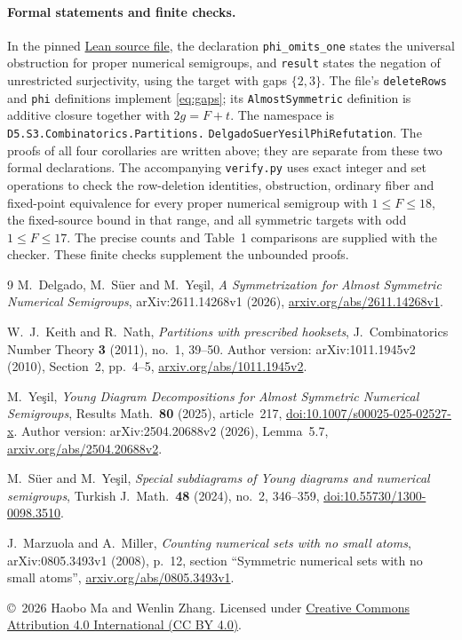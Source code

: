 \documentclass[11pt]{article}
\begin{document}
\paragraph{Formal statements and finite checks.}
In the pinned \href{https://github.com/the-omega-institute/trureturing/blob/f960cb09514c99f42fd07398f5240a77378ea4db/D5/S3/Combinatorics/Partitions/DelgadoSuerYesilPhiRefutation.lean}{Lean source file},
the declaration \texttt{phi\_omits\_one} states the universal obstruction for
proper numerical semigroups, and \texttt{result} states the negation of
unrestricted surjectivity, using the target with gaps $\{2,3\}$.
The file's \texttt{deleteRows} and \texttt{phi} definitions implement
\eqref{eq:gaps}; its \texttt{AlmostSymmetric} definition is additive closure
together with $2g=F+t$. The namespace is
\texttt{D5.S3.Combinatorics.Partitions.}\allowbreak
\texttt{DelgadoSuerYesilPhiRefutation}.
The proofs of all four corollaries are written above; they are separate
from these two formal declarations.
The accompanying \texttt{verify.py} uses exact integer and set operations to
check the row-deletion identities, obstruction, ordinary fiber and fixed-point
equivalence for every proper numerical semigroup with $1\leq F\leq18$,
the fixed-source bound in that range, and all symmetric targets with odd
$1\leq F\leq17$. The precise counts and Table~1 comparisons are supplied
with the checker. These finite checks supplement the unbounded proofs.

\begin{thebibliography}{9}
\small
{}
M.~Delgado, M.~S\"uer and M.~Ye\c{s}il,
\emph{A Symmetrization for Almost Symmetric Numerical Semigroups},
arXiv:2611.14268v1 (2026),
\href{https://arxiv.org/abs/2611.14268v1}{arxiv.org/abs/2611.14268v1}.

W.~J.~Keith and R.~Nath,
\emph{Partitions with prescribed hooksets},
J.~Combinatorics Number Theory \textbf{3} (2011), no.~1, 39--50.
Author version: arXiv:1011.1945v2 (2010), Section~2, pp.~4--5,
\href{https://arxiv.org/abs/1011.1945v2}{arxiv.org/abs/1011.1945v2}.

M.~Ye\c{s}il,
\emph{Young Diagram Decompositions for Almost Symmetric Numerical Semigroups},
Results Math.~\textbf{80} (2025), article~217,
\href{https://doi.org/10.1007/s00025-025-02527-x}{doi:10.1007/s00025-025-02527-x}.
Author version: arXiv:2504.20688v2 (2026), Lemma~5.7,
\href{https://arxiv.org/abs/2504.20688v2}{arxiv.org/abs/2504.20688v2}.

M.~S\"uer and M.~Ye\c{s}il,
\emph{Special subdiagrams of Young diagrams and numerical semigroups},
Turkish J.~Math.~\textbf{48} (2024), no.~2, 346--359,
\href{https://doi.org/10.55730/1300-0098.3510}{doi:10.55730/1300-0098.3510}.

J.~Marzuola and A.~Miller,
\emph{Counting numerical sets with no small atoms}, arXiv:0805.3493v1 (2008),
p.~12, section ``Symmetric numerical sets with no small atoms'',
\href{https://arxiv.org/abs/0805.3493v1}{arxiv.org/abs/0805.3493v1}.
\end{thebibliography}

\smallskip
\noindent\small\copyright\ 2026 Haobo Ma and Wenlin Zhang.
Licensed under \href{https://creativecommons.org/licenses/by/4.0/}{Creative
Commons Attribution 4.0 International (CC BY 4.0)}.
\end{document}
